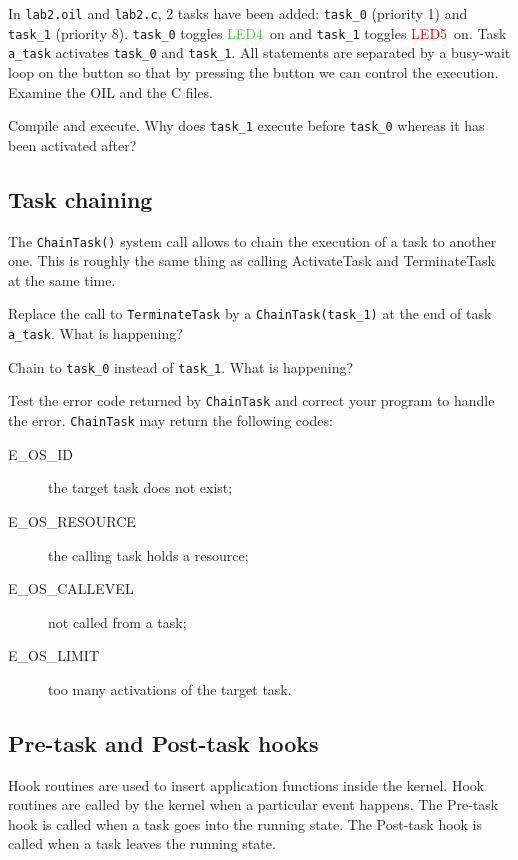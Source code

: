 \documentclass[11pt]{article}
\newcommand{\LEDgreen}{\textcolor{LimeGreen}{LED4}}
\newcommand{\LEDred}{\textcolor{red}{LED5}}
\begin{document}
In \texttt{lab2.oil} and \texttt{lab2.c}, 2 tasks have been added: \texttt{task_0} (priority 1) and \texttt{task_1} (priority 8). \texttt{task_0} toggles \LEDgreen\ on and \texttt{task_1} toggles \LEDred\ on. Task \texttt{a_task} activates \texttt{task_0} and \texttt{task_1}. All statements are separated by a busy-wait loop on the button so that by pressing the button we can control the execution. Examine the OIL and the C files.

Compile and execute. Why does \texttt{task_1} execute before \texttt{task_0} whereas it has been activated after?

\subsection{Task chaining}

The \texttt{ChainTask()} system call allows to chain the execution of a task to another one. This is roughly the same thing as calling ActivateTask and TerminateTask at the same time.

Replace the call to \texttt{TerminateTask} by a \texttt{ChainTask(task_1)} at the end of task \texttt{a_task}. What is happening?

Chain to \texttt{task_0} instead of \texttt{task_1}. What is happening?

Test the error code returned by \texttt{ChainTask} and correct your program to
handle the error. \texttt{ChainTask} may return the following codes:

\begin{description}
\item[E_OS_ID] the target task does not exist;
\item[E_OS_RESOURCE] the calling task holds a resource;
\item[E_OS_CALLEVEL] not called from a task;
\item[E_OS_LIMIT] too many activations of the target task.
\end{description}

\subsection{Pre-task and Post-task hooks}

Hook routines are used to insert application functions inside the kernel. Hook routines are called by the kernel when a particular event happens. The Pre-task hook is called when a task goes into the running state. The Post-task hook is called when a task leaves the running state.
\end{document}
